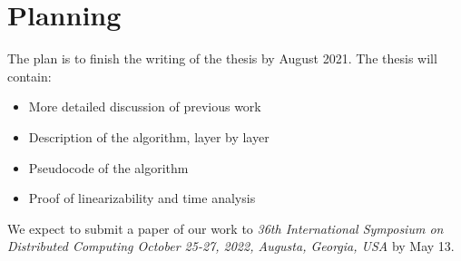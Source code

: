 \documentclass[12pt]{article}
\begin{document}
\section{Planning}
The plan is to finish the writing of the thesis by August 2021. The thesis will contain:
\begin{itemize}
  \item More detailed discussion of previous work
  \item Description of the algorithm, layer by layer
  \item Pseudocode of the algorithm
  \item Proof of linearizability and time analysis
\end{itemize}

We expect to submit a paper of our work to \textit{36th International Symposium on Distributed Computing
October 25-27, 2022, Augusta, Georgia, USA} by May 13.

 

\end{document}
